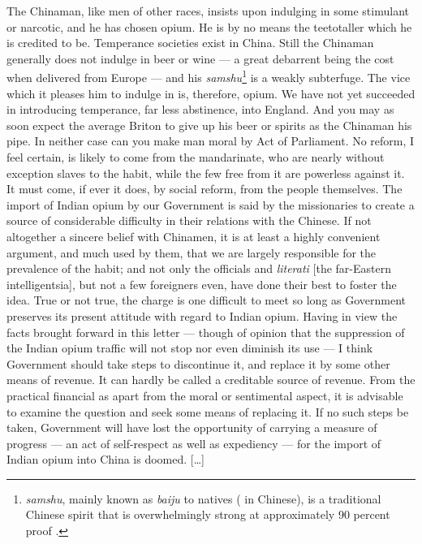 \begin{fancyquote}
        [\ldots] The Chinaman, like men of other races, insists upon indulging
        in some stimulant or narcotic, and he has chosen opium. He is by no
        means the teetotaller which he is credited to be. Temperance societies
        exist in China. Still the Chinaman generally does not indulge in beer or
        wine --- a great debarrent being the cost when delivered from Europe ---
        and his \textit{samshu}\footnote{\textit{samshu}, mainly known as
        \textit{baiju} to natives ( in Chinese), is a traditional
        Chinese spirit that is overwhelmingly strong at approximately 90 percent
        proof \autocite{Antkiewicz:1993}.} is a weakly subterfuge. The vice
        which it pleases him to indulge in is, therefore, opium. We have not yet
        succeeded in introducing temperance, far less abstinence, into England.
        And you may as soon expect the average Briton to give up his beer or
        spirits as the Chinaman his pipe. In neither case can you make man moral
        by Act of Parliament. No reform, I feel certain, is likely to come from
        the mandarinate, who are nearly without exception slaves to the habit,
        while the few free from it are powerless against it. It must come, if
        ever it does, by social reform, from the people themselves. The import
        of Indian opium by our Government is said by the missionaries to create
        a source of considerable difficulty in their relations with the Chinese.
        If not altogether a sincere belief with Chinamen, it is at least a
        highly convenient argument, and much used by them, that we are largely
        responsible for the prevalence of the habit; and not only the officials
        and \textit{literati} [the far-Eastern intelligentsia], but not a few
        foreigners even, have done their best to foster the idea. True or not
        true, the charge is one difficult to meet so long as Government
        preserves its present attitude with regard to Indian opium. Having in
        view the facts brought forward in this letter --- though of opinion that
        the suppression of the Indian opium traffic will not stop nor even
        diminish its use --- I think Government should take steps to discontinue
        it, and replace it by some other means of revenue. It can hardly be
        called a creditable source of revenue. From the practical financial as
        apart from the moral or sentimental aspect, it is advisable to examine
        the question and seek some means of replacing it. If no such steps be
        taken, Government will have lost the opportunity of carrying a measure
        of progress --- an act of self-respect as well as expediency --- for the
        import of Indian opium into China is doomed. [\ldots]
	\begin{flushright}
		\autocite{SpecialCorrespondent:1884}
	\end{flushright}
\end{fancyquote}
